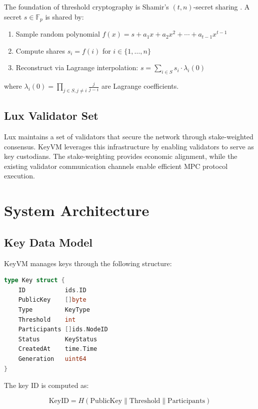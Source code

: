 \documentclass[11pt,twocolumn]{article}
\begin{document}
The foundation of threshold cryptography is Shamir's $(t,n)$-secret sharing \cite{shamir1979share}. A secret $s \in \mathbb{F}_p$ is shared by:

\begin{enumerate}
\item Sample random polynomial $f(x) = s + a_1 x + a_2 x^2 + \cdots + a_{t-1} x^{t-1}$
\item Compute shares $s_i = f(i)$ for $i \in \{1, \ldots, n\}$
\item Reconstruct via Lagrange interpolation: $s = \sum_{i \in S} s_i \cdot \lambda_i(0)$
\end{enumerate}

where $\lambda_i(0) = \prod_{j \in S, j \neq i} \frac{j}{j-i}$ are Lagrange coefficients.

\subsection{Lux Validator Set}

Lux maintains a set of validators that secure the network through stake-weighted consensus. KeyVM leverages this infrastructure by enabling validators to serve as key custodians. The stake-weighting provides economic alignment, while the existing validator communication channels enable efficient MPC protocol execution.

\section{System Architecture}

\subsection{Key Data Model}

KeyVM manages keys through the following structure:

\begin{lstlisting}[language=Go,basicstyle=\ttfamily\small]
type Key struct {
    ID           ids.ID
    PublicKey    []byte
    Type         KeyType
    Threshold    int
    Participants []ids.NodeID
    Status       KeyStatus
    CreatedAt    time.Time
    Generation   uint64
}
\end{lstlisting}

The key ID is computed as:

\begin{equation}
\text{KeyID} = H(\text{PublicKey} \| \text{Threshold} \| \text{Participants})
\end{equation}
\end{document}
